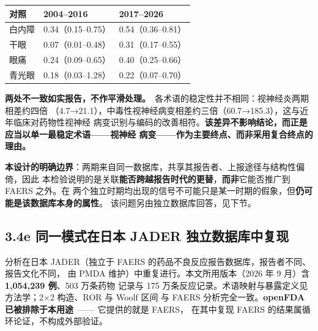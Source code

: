 \documentclass[UTF8,fontset=windows,11pt]{ctexart}
\begin{document}
\begin{center}
\small
\begin{longtable}{p{}p{}p{}}
\hline
对照 & 2004–2016 & 2017–2026 \\
\hline
白内障 & 0.34（0.15–0.75） & 0.54（0.36–0.81） \\
干眼 & 0.07（0.01–0.48） & 0.31（0.17–0.55） \\
眼痛 & 0.24（0.09–0.65） & 0.40（0.25–0.66） \\
青光眼 & 0.18（0.03–1.28） & 0.22（0.07–0.70） \\
\hline
\end{longtable}
\end{center}

\textbf{两处不一致如实报告，不作平滑处理。}\ 各术语的稳定性并不相同：视神经炎两期相差约四倍 （4.7→21.1），中毒性视神经病变相差约三倍（60.7→185.3），这与近年临床对药物性视神经 病变识别与编码的改善相符。\textbf{该差异不影响结论，而正是应当以单一最稳定术语——视神经 病变——作为主要终点、而非采用复合终点的理由。}

\textbf{本设计的明确边界}：两期来自同一数据库，共享其报告者、上报途径与结构性偏倚，因此 本检验说明的是关联\textbf{能否跨越报告时代的更替}，\textbf{而非}它能否推广到 FAERS 之外。在 两个独立时期均出现的信号不可能只是某一时期的假象，但\textbf{仍可能是该数据库本身的属性}。 该问题另由独立数据库回答，见下节。

\subsection{3.4e 同一模式在日本 JADER 独立数据库中复现}

分析在日本 JADER（独立于 FAERS 的药品不良反应报告数据库，报告者不同、报告文化不同， 由 PMDA 维护）中重复进行。本文所用版本（2026 年 9 月）含 \textbf{1,054,239 例}、503 万条药物 记录与 175 万条反应记录。术语映射与暴露定义见方法学；2×2 构造、ROR 与 Woolf 区间 与 FAERS 分析完全一致。\textbf{openFDA 已被排除于本用途}\ —— 它提供的就是 FAERS， 在其中复现 FAERS 的结果属循环论证，不构成外部验证。
\end{document}
